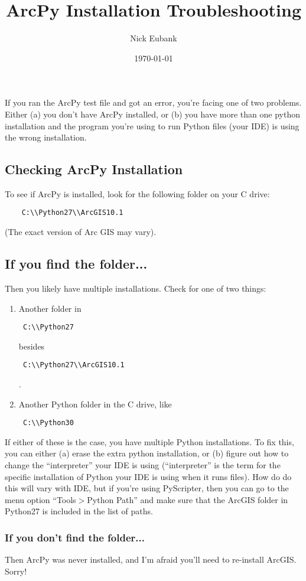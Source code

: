 \documentclass[12pt]{article}
\title{ArcPy Installation Troubleshooting}
\author{Nick Eubank}
\date{\today}
\begin{document}
 
\maketitle

If you ran the ArcPy test file and got an error, you're facing one of two problems. Either (a) you don't have ArcPy installed, or (b) you have more than one python installation and the program you're using to run Python files (your IDE) is using the wrong installation. 

\subsection*{Checking ArcPy Installation}
To see if ArcPy is installed, look for the following folder on your C drive:

\begin{verbatim}
	C:\\Python27\\ArcGIS10.1
\end{verbatim}
(The exact version of Arc GIS may vary).

\subsection*{If you find the folder...}
Then you likely have multiple installations. Check for one of two things:
\begin{enumerate}
	\item Another folder in
	\begin{verbatim} C:\\Python27 \end{verbatim} 
		besides \begin{verbatim} C:\\Python27\\ArcGIS10.1\end{verbatim}.
	\item Another Python folder in the C drive, like \begin{verbatim} C:\\Python30 \end{verbatim}
\end{enumerate}
If either of these is the case, you have multiple Python installations. To fix this, you can either (a) erase the extra python installation, or (b) figure out how to change the ``interpreter'' your IDE is using (``interpreter'' is the term for the specific installation of Python your IDE is using when it runs files). How do do this will vary with IDE, but if you're using PyScripter, then you can go to the menu option ``Tools$>$Python Path'' and make sure that the ArcGIS folder in Python27 is included in the list of paths. 

\subsubsection*{If you don't find the folder...}
Then ArcPy was never installed, and I'm afraid you'll need to re-install ArcGIS. Sorry!
\end{document}
